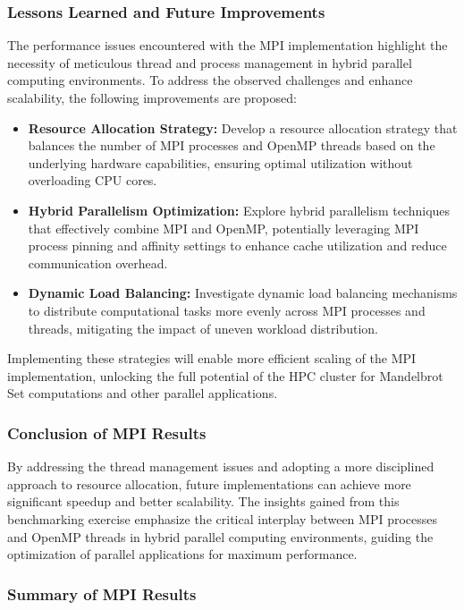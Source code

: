 \documentclass[
	report, %
	11pt, %
]{CSUniSchoolLabReport}
\newcounter{ct}
\begin{document}
\subsubsection{Lessons Learned and Future Improvements}

The performance issues encountered with the MPI implementation highlight the necessity of meticulous thread and process management in hybrid parallel computing environments. To address the observed challenges and enhance scalability, the following improvements are proposed:

\begin{itemize}
	\item \textbf{Resource Allocation Strategy:} Develop a resource allocation strategy that balances the number of MPI processes and OpenMP threads based on the underlying hardware capabilities, ensuring optimal utilization without overloading CPU cores.
	\item \textbf{Hybrid Parallelism Optimization:} Explore hybrid parallelism techniques that effectively combine MPI and OpenMP, potentially leveraging MPI process pinning and affinity settings to enhance cache utilization and reduce communication overhead.
	\item \textbf{Dynamic Load Balancing:} Investigate dynamic load balancing mechanisms to distribute computational tasks more evenly across MPI processes and threads, mitigating the impact of uneven workload distribution.
\end{itemize}

Implementing these strategies will enable more efficient scaling of the MPI implementation, unlocking the full potential of the HPC cluster for Mandelbrot Set computations and other parallel applications.

\subsubsection{Conclusion of MPI Results}

By addressing the thread management issues and adopting a more disciplined approach to resource allocation, future implementations can achieve more significant speedup and better scalability. The insights gained from this benchmarking exercise emphasize the critical interplay between MPI processes and OpenMP threads in hybrid parallel computing environments, guiding the optimization of parallel applications for maximum performance.

\subsubsection{Summary of MPI Results}
\end{document}
